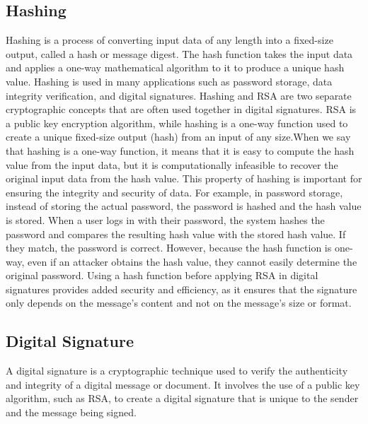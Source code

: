 \subsection*{Hashing}
Hashing is a process of converting input data of any length into a fixed-size output, called a hash or message digest. 
The hash function takes the input data and applies a one-way mathematical algorithm to it to produce a unique hash value. 
Hashing is used in many applications such as password storage, data integrity verification, and digital signatures.
Hashing and RSA are two separate cryptographic concepts that are often used together in digital signatures. RSA is a public key encryption algorithm, 
while hashing is a one-way function used to create a unique fixed-size output (hash) from an input of any size.When we say that hashing is a one-way function, 
it means that it is easy to compute the hash value from the input data, but it is computationally infeasible to recover the original input data from the hash value.
This property of hashing is important for ensuring the integrity and security of data. For example, in password storage, instead of storing the actual password, the password is hashed and the hash value is stored. 
When a user logs in with their password, the system hashes the password and compares the resulting hash value with the stored hash value. If they match, the password is correct. 
However, because the hash function is one-way, even if an attacker obtains the hash value, they cannot easily determine the original password.
Using a hash function before applying RSA in digital signatures provides added security and efficiency, as it ensures that the signature only depends on the message's content and not on the message's size or format.

\subsection*{Digital Signature}
A digital signature is a cryptographic technique used to verify the authenticity and integrity of a digital message or document. 
It involves the use of a public key algorithm, such as RSA, to create a digital signature that is unique to the sender and the message being signed.
